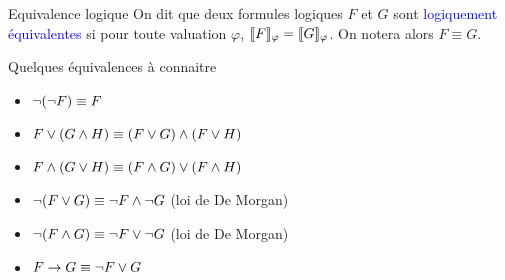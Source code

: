 \documentclass[10pt]{beamer}
\begin{document}
\begin{frame}{\Ctitle}{\stitle}
    \begin{alertblock}{Equivalence logique}
        On dit que deux formules logiques $F$ et $G$ sont \textcolor{blue}{logiquement équivalentes} si pour toute valuation $\varphi$, $\llbracket F \rrbracket_{\varphi} = \llbracket G \rrbracket_{\varphi}$.
        On notera alors $F \equiv G$.\\
    \end{alertblock}
    {\begin{block}{Quelques équivalences à connaitre}
        \begin{itemize}
            \item<3-> $\neg (\neg F) \equiv F$
            \item<4-> $F \vee (G \wedge H) \equiv (F \vee G) \wedge (F \vee H)$
            \item<5-> $F \wedge (G \vee H) \equiv (F \wedge G) \vee (F \wedge H)$ 
            \item<6-> $\neg (F \vee G) \equiv \neg F \wedge \neg G$  (loi de De Morgan)
            \item<7-> $\neg (F \wedge G) \equiv \neg F \vee \neg G$ (loi de De Morgan)
            \item<8-> $F \to G \equiv   \neg F \vee G $
        \end{itemize}
    \end{block}
}
\end{frame}
\end{document}

